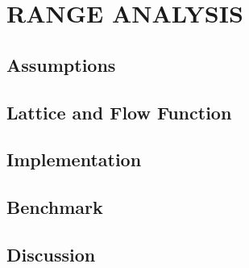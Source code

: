 \section{RANGE ANALYSIS}

\subsection{Assumptions}

\subsection{Lattice and Flow Function}

\subsection{Implementation}

\subsection{Benchmark}

\subsection{Discussion}
